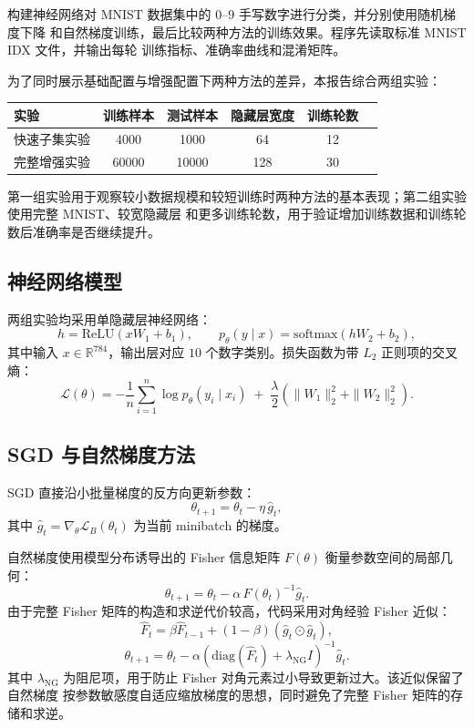 \documentclass[UTF8]{ctexart}
\begin{document}
构建神经网络对 MNIST 数据集中的 $0$--$9$ 手写数字进行分类，并分别使用随机梯度下降
和自然梯度训练，最后比较两种方法的训练效果。程序先读取标准 MNIST IDX 文件，并输出每轮
训练指标、准确率曲线和混淆矩阵。

为了同时展示基础配置与增强配置下两种方法的差异，本报告综合两组实验：
\begin{center}
	\begin{tabular}{lccccc}
		\toprule
		实验 & 训练样本 & 测试样本 & 隐藏层宽度 & 训练轮数  \\
		\midrule
		快速子集实验 & 4000 & 1000 & 64 & 12 \\
		完整增强实验 & 60000 & 10000 & 128 & 30  \\
		\bottomrule
	\end{tabular}
\end{center}

第一组实验用于观察较小数据规模和较短训练时两种方法的基本表现；第二组实验使用完整 MNIST、较宽隐藏层
和更多训练轮数，用于验证增加训练数据和训练轮数后准确率是否继续提升。

\subsection{神经网络模型}

两组实验均采用单隐藏层神经网络：
\[
h=\mathrm{ReLU}(xW_1+b_1),\qquad
p_\theta(y\mid x)=\mathrm{softmax}(hW_2+b_2),
\]
其中输入 $x\in\mathbb{R}^{784}$，输出层对应 $10$ 个数字类别。损失函数为带 $L_2$ 正则项的交叉熵：
\[
\mathcal{L}(\theta)=
-\frac{1}{n}\sum_{i=1}^{n}\log p_\theta(y_i\mid x_i)
\;+\;\frac{\lambda}{2}\left(\|W_1\|_2^2+\|W_2\|_2^2\right).
\]

\subsection{SGD 与自然梯度方法}

SGD 直接沿小批量梯度的反方向更新参数：
\[
\theta_{t+1}=\theta_t-\eta\,\hat g_t,
\]
其中 $\hat g_t=\nabla_\theta \mathcal{L}_B(\theta_t)$ 为当前 minibatch 的梯度。

自然梯度使用模型分布诱导出的 Fisher 信息矩阵 $F(\theta)$ 衡量参数空间的局部几何：
\[
\theta_{t+1}=\theta_t-\alpha\,F(\theta_t)^{-1}\hat g_t.
\]
由于完整 Fisher 矩阵的构造和求逆代价较高，代码采用对角经验 Fisher 近似：
\[
\hat F_t=\beta \hat F_{t-1}+(1-\beta)(\hat g_t\odot \hat g_t),
\]
\[
\theta_{t+1}
=\theta_t-\alpha\left(\mathrm{diag}(\hat F_t)+\lambda_{\mathrm{NG}}I\right)^{-1}\hat g_t.
\]
其中 $\lambda_{\mathrm{NG}}$ 为阻尼项，用于防止 Fisher 对角元素过小导致更新过大。该近似保留了自然梯度
按参数敏感度自适应缩放梯度的思想，同时避免了完整 Fisher 矩阵的存储和求逆。
\end{document}
